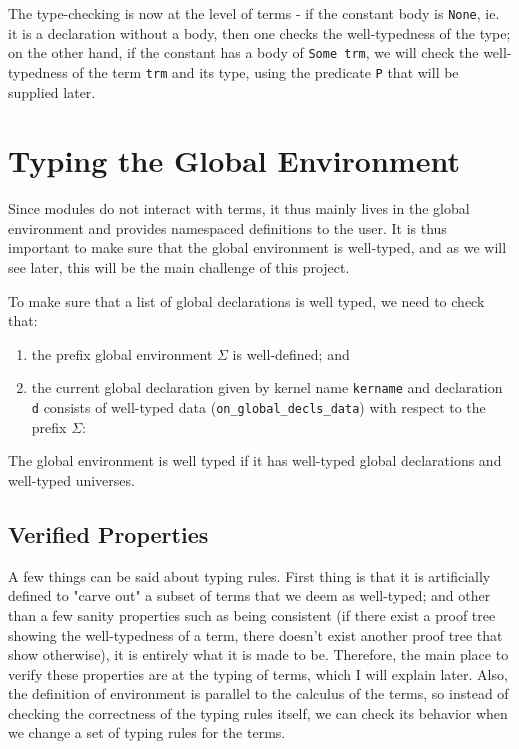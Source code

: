 
The type-checking is now at the level of terms - if the constant body is
\verb|None|, ie. it is a declaration without a body, then one checks the
well-typedness of the type; on the other hand, if the constant has a body of
\verb|Some trm|, we will check the well-typedness of the term \verb|trm| and its
type, using the predicate \verb|P| that will be supplied later.

\section{Typing the Global Environment}
Since modules do not interact with terms, it thus mainly lives in the global
environment and provides namespaced definitions to the user. It is thus
important to make sure that the global environment is well-typed, and as we will
see later, this will be the main challenge of this project.


To make sure that a list of global declarations is well typed, we need to check that:
\begin{enumerate}
  \item the prefix global environment $\Sigma$ is well-defined; and
  \item the current global declaration given by kernel name \verb|kername| and
  declaration \verb|d| consists of well-typed data
  (\verb|on_global_decls_data|) with respect to the prefix $\Sigma$:
\end{enumerate}

The global environment is well typed if it has well-typed global declarations
and well-typed universes.


\subsection*{Verified Properties}
A few things can be said about typing rules. First thing is that it is
artificially defined to "carve out" a subset of terms that we deem as
well-typed; and other than a few sanity properties such as being consistent (if
there exist a proof tree showing the well-typedness of a term, there doesn't
exist another proof tree that show otherwise), it is entirely what it is made to
be. Therefore, the main place to verify these properties are at the typing of
terms, which I will explain later. Also, the definition of environment is
parallel to the calculus of the terms, so instead of checking the correctness of
the typing rules itself, we can check its behavior when we change a set of
typing rules for the terms.

